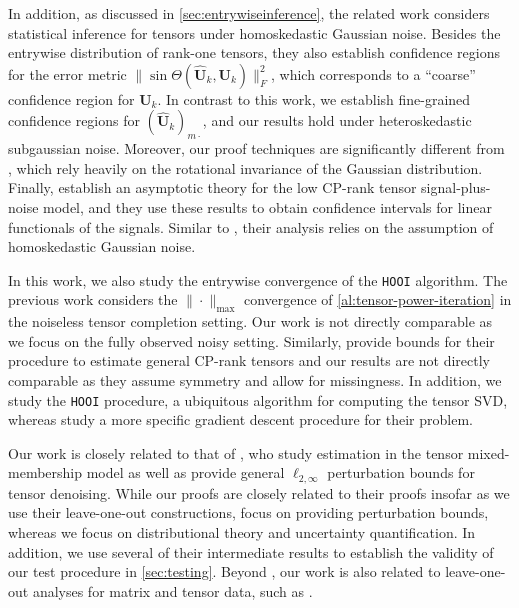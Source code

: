 \documentclass[10pt]{article}
\newcommand{\0}{{\mathbf{0}}}
\newcommand{\1}{{\mathbf{1}}}
\newcommand{\U}{{\mathbf{U}}}
\renewcommand{\citet}{\cite}
\newcommand{\uhat}{\mathbf{\hat{U}}}
\renewcommand{\hat}{\widehat}
\renewcommand{\hat}{\widehat}
\begin{document}
In addition, as discussed in \cref{sec:entrywiseinference}, the related work \citet{xia_inference_2022} considers statistical inference for tensors under homoskedastic Gaussian noise.  Besides the entrywise distribution of rank-one tensors, they also establish confidence regions for the error metric $\|\sin\Theta(\uhat_k,\U_k)\|^2_F$, which corresponds to a ``coarse'' confidence region for $\U_k$.  In contrast to this work, we establish fine-grained confidence regions for $(\uhat_k)_{m\cdot}$, and our results hold under heteroskedastic subgaussian noise.  Moreover, our proof techniques are significantly different from \citet{xia_inference_2022}, which rely heavily on the rotational invariance of the Gaussian distribution.  Finally, \citet{huang_power_2022} establish an asymptotic theory for the low CP-rank tensor signal-plus-noise model, and they use these results to obtain confidence intervals for linear functionals of the signals.  Similar to \citet{xia_inference_2022}, their analysis relies on the assumption of homoskedastic Gaussian noise.


In this work, we also study the entrywise convergence of the \texttt{HOOI} algorithm.  The previous work \citet{wang_implicit_2021} considers the $\|\cdot\|_{\max}$ convergence of \cref{al:tensor-power-iteration} in the noiseless tensor completion setting.  Our work is not directly comparable as we focus on the fully observed noisy setting.  Similarly,  \citet{cai_nonconvex_2022} provide bounds for their procedure to estimate general CP-rank tensors and our results are not directly comparable as they assume symmetry and allow for missingness.  In addition, we study the \texttt{HOOI} procedure, a ubiquitous algorithm for computing the tensor SVD, whereas  \citet{cai_nonconvex_2022} study a more specific gradient descent procedure for their problem.


Our work is closely related to that of \citet{agterberg_estimating_2022}, who study estimation in the tensor mixed-membership model as well as provide general $\ell_{2,\infty}$ perturbation bounds for tensor denoising.  While our proofs are closely related to their proofs insofar as we use their leave-one-out constructions,  \citet{agterberg_estimating_2022} focus on providing perturbation bounds, whereas we focus on distributional theory and uncertainty quantification.  In addition, we use several of their intermediate results to establish the validity of our test procedure in \cref{sec:testing}.  Beyond \citet{agterberg_estimating_2022}, our work is also related to leave-one-out analyses for matrix and tensor data, such as \citet{abbe_entrywise_2020,cai_nonconvex_2022,cai_subspace_2021,cai_uncertainty_2022,yan_inference_2021}.    
\end{document}

